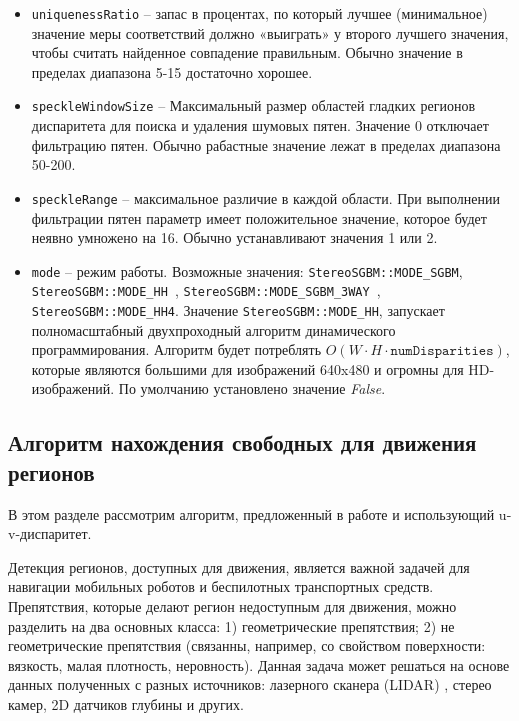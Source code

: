\documentclass[oneside,final,12pt]{scrartcl}
\begin{document}
\begin{itemize}
			 	\item \texttt{uniquenessRatio} -- запас в процентах, по который лучшее (минимальное) значение меры соответствий должно «выиграть» у второго лучшего значения, чтобы считать найденное совпадение правильным. Обычно значение в пределах диапазона 5-15 достаточно хорошее.

			 	\item \texttt{speckleWindowSize} -- Максимальный размер областей гладких регионов диспаритета для поиска и удаления шумовых пятен. Значение 0 отключает фильтрацию пятен. Обычно рабастные значение лежат в пределах диапазона 50-200.

			 	\item \texttt{speckleRange}	-- максимальное различие в каждой области. При выполнении фильтрации пятен параметр имеет положительное значение, которое будет неявно умножено на 16. Обычно устанавливают значения 1 или 2.

			 	\item \texttt{mode}	-- режим работы. Возможные значения: \texttt{StereoSGBM::MODE\_SGBM}, \texttt{StereoSGBM::MODE\_HH }, \texttt{StereoSGBM::MODE\_SGBM\_3WAY }, \texttt{StereoSGBM::MODE\_HH4}. Значение \texttt{StereoSGBM::MODE\_HH}, запускает полномасштабный двухпроходный алгоритм динамического программирования. Алгоритм будет потреблять \(O \left(W \cdot H \cdot \texttt{numDisparities}\right)\), которые являются большими для изображений 640x480 и огромны для HD-изображений. По умолчанию установлено значение \textit{False}.
		 	\end{itemize}

	 	\subsection{Алгоритм нахождения свободных для движения регионов}
	 	\label{subsec:tr_reg_alg}
	 		В этом разделе рассмотрим алгоритм, предложенный в работе \cite{Zhu2013} и использующий u-v-диспаритет.

	 		Детекция регионов, доступных для движения, является важной задачей для навигации мобильных роботов и беспилотных транспортных средств. Препятствия, которые делают регион недоступным для движения, можно разделить на два основных класса: 1) геометрические препятствия; 2) не геометрические препятствия (связанны, например,  со свойством поверхности: вязкость, малая плотность, неровность).
	 		Данная задача может решаться на основе данных полученных с разных источников:  лазерного сканера (LIDAR) , стерео камер, 2D датчиков глубины и других.
\end{document}
